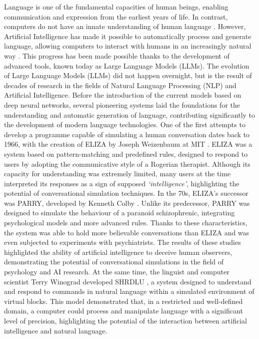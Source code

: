 Language is one of the fundamental capacities of human beings, enabling communication and expression from the earliest years of life. In contrast, computers do not have an innate understanding of human language \cite{zhao2025surveylargelanguagemodels}.
However, Artificial Intelligence has made it possible to automatically process and generate language, allowing computers to interact with humans in an increasingly natural way \cite{Turing1950}.
This progress has been made possible thanks to the development of advanced tools, known today as Large Language Models (LLMs).
The evolution of Large Language Models (LLMs) did not happen overnight, but is the result of decades of research in the fields of Natural Language Processing (NLP) \cite{NLP} and Artificial Intelligence.
Before the introduction of the current models based on deep neural networks, several pioneering systems laid the foundations for the understanding and automatic generation of language, contributing significantly to the development of modern language technologies.
One of the first attempts to develop a programme capable of simulating a human conversation dates back to 1966, with the creation of ELIZA by Joseph Weizenbaum at MIT \cite{Segal_2025}.
ELIZA was a system based on pattern-matching \cite{PatternMatching} and predefined rules, designed to respond to users by adopting the communicative style of a Rogerian therapist.
Although its capacity for understanding was extremely limited, many users at the time interpreted its responses as a sign of supposed \textit{‘intelligence’}, highlighting the potential of conversational simulation techniques.
In the 70s, ELIZA's successor was PARRY, developed by Kenneth Colby \cite{parry2025}.
Unlike its predecessor, PARRY was designed to simulate the behaviour of a paranoid schizophrenic, integrating psychological models and more advanced rules. Thanks to these characteristics, the system was able to hold more believable conversations than ELIZA and was even subjected to experiments with psychiatrists. The results of these studies highlighted the ability of artificial intelligence to deceive human observers, demonstrating the potential of conversational simulations in the field of psychology and AI research.
At the same time, the linguist and computer scientist Terry Winograd developed SHRDLU \cite{winograd2025}, a system designed to understand and respond to commands in natural language within a simulated environment of virtual blocks.
This model demonstrated that, in a restricted and well-defined domain, a computer could process and manipulate language with a significant level of precision, highlighting the potential of the interaction between artificial intelligence and natural language.
